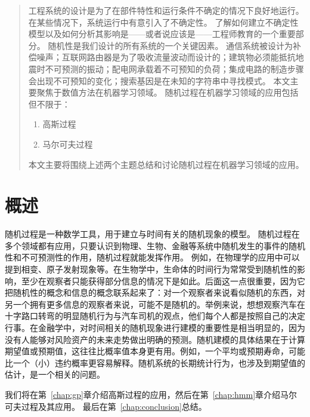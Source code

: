 \documentclass[degree=project, degree-type=project]{thuthesis}
\begin{document}
\maketitle

\frontmatter
\begin{abstract}
	工程系统的设计是为了在部件特性和运行条件不确定的情况下良好地运行。
	在某些情况下，系统运行中有意引入了不确定性。
	了解如何建立不确定性模型以及如何分析其影响是——或者说应该是——工程师教育的一个重要部分。
	随机性是我们设计的所有系统的一个关键因素。
	通信系统被设计为补偿噪声；互联网路由器是为了吸收流量波动而设计的；建筑物必须能抵抗地震时不可预测的振动；配电网承载着不可预知的负荷；集成电路的制造步骤会出现不可预知的变化；搜索基因是在未知的字符串中寻找模式。
	本文主要聚焦于数值方法在机器学习领域。
	随机过程在机器学习领域的应用包括但不限于：
	\begin{enumerate}
		\item 高斯过程
		\item 马尔可夫过程
	\end{enumerate}
	本文主要将围绕上述两个主题总结和讨论随机过程在机器学习领域的应用。

\end{abstract}

\tableofcontents
\mainmatter

\chapter{概述}
\label{chap:intro}
随机过程是一种数学工具，用于建立与时间有关的随机现象的模型。
随机过程在多个领域都有应用，只要认识到物理、生物、金融等系统中随机发生的事件的随机性和不可预测性的作用，随机过程就能发挥作用。
例如，在物理学的应用中可以提到相变、原子发射现象等。在生物学中，生命体的时间行为常常受到随机性的影响，至少在观察者只能获得部分信息的情况下是如此。后面这一点很重要，因为它把随机性的概念和信息的概念联系起来了：对一个观察者来说看似随机的东西，对另一个拥有更多信息的观察者来说，可能不是随机的。举例来说，想想观察汽车在十字路口转弯的明显随机行为与汽车司机的观点，他们每个人都是按照自己的决定行事。在金融学中，对时间相关的随机现象进行建模的重要性是相当明显的，因为没有人能够对风险资产的未来走势做出明确的预测。随机建模的具体结果在于计算期望值或预期值，这往往比概率值本身更有用。例如，一个平均或预期寿命，可能比一个（小）违约概率更容易解释。随机系统的长期统计行为，也涉及到期望值的估计，是一个相关的问题。

我们将在第~\ref{chap:gp}章介绍高斯过程的应用，然后在第~\ref{chap:hmm}章介绍马尔可夫过程及其应用。
最后在第~\ref{chap:conclusion}总结。
\end{document}
